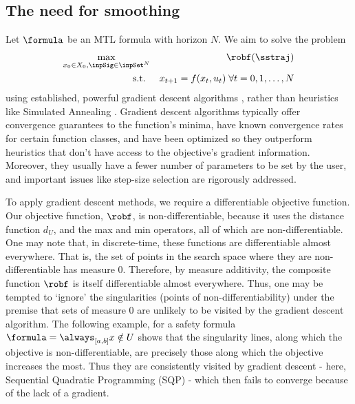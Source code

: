\subsection{The need for smoothing}
\label{sec:need for smoothing}
Let $\formula$ be an MTL formula with horizon $N$.
We aim to solve the problem
\begin{eqnarray}
\label{eq:min rob problem}
\max_{x_0 \in X_0, \inpSig \in \inpSet^N} && \robf(\sstraj)
\nonumber
\\
\text{s.t. } && x_{t+1} = f(x_t,u_t) \; \forall t=0,1,\ldots,N
\end{eqnarray}
using established, powerful gradient descent algorithms \cite{Polak97_Optim}, rather than heuristics like Simulated Annealing \cite{kirkpatrickV_SA83}.
Gradient descent algorithms typically offer convergence guarantees to the function's minima, have known convergence rates for certain function classes, and have been optimized so they outperform heuristics that don't have access to the objective's gradient information.
Moreover, they usually have a fewer number of parameters to be set by the user, and important issues like step-size selection are rigorously addressed.

To apply gradient descent methods, we require a differentiable objective function. 
Our objective function, $\robf$, is non-differentiable, because it uses the distance function $d_U$, and the max and min operators, all of which are non-differentiable.
One may note that, in discrete-time, these functions are differentiable almost everywhere. 
That is, the set of points in the search space where they are non-differentiable has measure 0. 
Therefore, by measure additivity, the composite function $\robf$ is itself differentiable almost everywhere.
Thus, one may be tempted to `ignore' the singularities (points of non-differentiability) under the premise that sets of measure 0 are unlikely to be visited by the gradient descent algorithm.
The following example, for a safety formula $\formula = \always_{[a,b]} x \notin U$ shows that the singularity lines, along which the objective is non-differentiable, are precisely those along which the objective increases the most. 
Thus they are consistently visited by gradient descent - here, Sequential Quadratic Programming (SQP) \cite{Polak97_Optim} - which then fails to converge because of the lack of a gradient.

